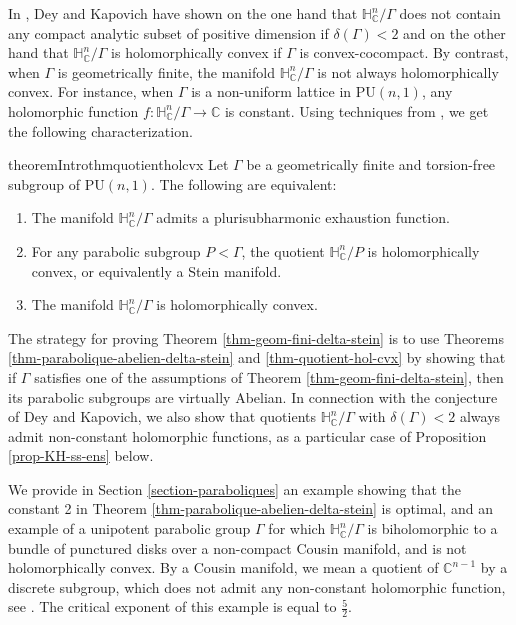 \documentclass{article}
\theoremstyle{definition}
\theoremstyle{remark}
\newcommand{\C}{\mathbb{C}}
\newcommand{\HNC}{\mathbb{H}^{n}_{\C}}
\newcommand{\PU}{\mathrm{PU}}
\begin{document}
	
	In \cite{deyNoteComplexhyperbolicKleinian2020}, Dey and Kapovich have shown on the one hand that $\HNC/\Gamma$ does not contain any compact analytic subset of positive dimension if $\delta(\Gamma)<2$ and on the other hand that $\HNC/\Gamma$ is holomorphically convex if $\Gamma$ is convex-cocompact. By contrast, when $\Gamma$ is geometrically finite, the manifold $\HNC/\Gamma$ is not always holomorphically convex. For instance, when $\Gamma$ is a non-uniform lattice in $\PU(n,1)$, any holomorphic function $f:\HNC/\Gamma\to \C$ is constant. Using techniques from \cite{chenDiscreteGroupsHolomorphic2013}, we get the following characterization.
	
	\begin{restatable}{theoremIntro}{thmquotientholcvx}\label{thm-quotient-hol-cvx}
		Let $\Gamma$ be a geometrically finite and torsion-free subgroup of $\PU(n,1)$. The following are equivalent: \begin{enumerate}
			\item The manifold $\HNC/\Gamma$ admits a plurisubharmonic exhaustion function.
			\item For any parabolic subgroup $P<\Gamma$, the quotient $\HNC/P$ is holomorphically convex, or equivalently a Stein manifold.
			\item The manifold $\HNC/\Gamma$ is holomorphically convex.
		\end{enumerate}
	\end{restatable}
	
	 The strategy for proving Theorem \ref{thm-geom-fini-delta-stein} is to use Theorems \ref{thm-parabolique-abelien-delta-stein} and \ref{thm-quotient-hol-cvx} by showing that if $\Gamma$ satisfies one of the assumptions of Theorem \ref{thm-geom-fini-delta-stein}, then its parabolic subgroups are virtually Abelian. In connection with the conjecture of Dey and Kapovich, we also show that quotients $\HNC/\Gamma$ with $\delta(\Gamma)<2$ always admit non-constant holomorphic functions, as a particular case of Proposition \ref{prop-KH-ss-ens} below.
	
	We provide in Section \ref{section-paraboliques} an example showing that the constant 2 in Theorem \ref{thm-parabolique-abelien-delta-stein} is optimal, and an example of a unipotent parabolic group $\Gamma$ for which $\HNC/\Gamma$ is biholomorphic to a bundle of punctured disks over a non-compact Cousin manifold, and is not holomorphically convex. By a Cousin manifold, we mean a quotient of $\C^{n-1}$ by a discrete subgroup, which does not admit any non-constant holomorphic function, see \cite{cousinFonctionsTriplementPeriodiques1910,kopfermannMaximaleUntergruppenAbelscher1964,abeToroidalGroups2001}. The critical exponent of this example is equal to $\frac{5}{2}$.
	
\end{document}
